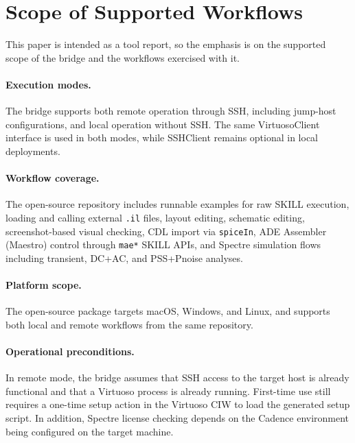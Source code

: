 \documentclass[lettersize,journal]{ieee_template/IEEEtran}
\begin{document}
\section{Scope of Supported Workflows}

This paper is intended as a tool report, so the emphasis is on the supported scope of the bridge and the workflows exercised with it.

\paragraph{Execution modes.} The bridge supports both remote operation through SSH, including jump-host configurations, and local operation without SSH. The same VirtuosoClient interface is used in both modes, while SSHClient remains optional in local deployments.

\paragraph{Workflow coverage.} The open-source repository includes runnable examples for raw SKILL execution, loading and calling external \texttt{.il} files, layout editing, schematic editing, screenshot-based visual checking, CDL import via \texttt{spiceIn}, ADE Assembler (Maestro) control through \texttt{mae*} SKILL APIs, and Spectre simulation flows including transient, DC+AC, and PSS+Pnoise analyses.

\paragraph{Platform scope.} The open-source package targets macOS, Windows, and Linux, and supports both local and remote workflows from the same repository.

\paragraph{Operational preconditions.} In remote mode, the bridge assumes that SSH access to the target host is already functional and that a Virtuoso process is already running. First-time use still requires a one-time setup action in the Virtuoso CIW to load the generated setup script. In addition, Spectre license checking depends on the Cadence environment being configured on the target machine.
\end{document}
